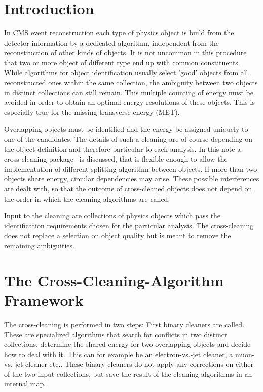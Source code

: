 \documentclass{cmspaper}
\begin{document}
\setcounter{page}{2}%


\newpage
\section{Introduction}

In CMS event reconstruction each type of physics object is build from the
detector information by a dedicated algorithm, independent from the
reconstruction of other kinds of objects. It is not uncommon in this procedure
that two or more object of different type end up with common constituents.
While algorithms for object identification usually select 'good' objects
from all reconstructed ones within the same collection, the ambiguity between two
objects in distinct collections can still remain. This multiple counting of
energy must be avoided in order to obtain an optimal energy resolutions of these
objects. This is especially true for the missing transverse energy (MET).

Overlapping objects must be identified and the energy be assigned uniquely to
one of the candidates. The details of such a cleaning are of course depending on
the object definition and therefore particular to each analysis.  In this note a
cross-cleaning package~\cite{package} is discussed, that is flexible enough to
allow the implementation of different splitting algorithm between objects.
If more than two objects share energy, circular dependencies may arise. These
possible interferences are dealt with, so that the outcome of cross-cleaned
objects does not depend on the order in which the cleaning algorithms are
called.

Input to the cleaning are collections of physics objects which pass the
identification requirements chosen for the particular analysis. The
cross-cleaning does not replace a selection on object quality but is meant to
remove the remaining ambiguities.


\section{The Cross-Cleaning-Algorithm Framework}
The cross-cleaning is performed in two steps: First binary cleaners are called.
These are specialized algorithms that search for conflicts in two distinct
collections, determine the shared energy for two overlapping objects and decide
how to deal with it. This can for example be an electron-vs.-jet cleaner, a
muon-vs.-jet cleaner etc.. These binary cleaners do not apply any corrections
on either of the two input collections, but save the result of the cleaning
algorithms in an internal map.
\end{document}
